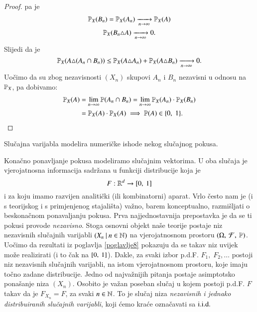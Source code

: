 \begin{proof}
    pa je
    \begin{equation*}
        \begin{gathered}
            \mathbb{P}_X (B_n) = \mathbb{P}_X (A_n) \xrightarrow[n \to \infty]{} \mathbb{P}_X (A)\\
            \mathbb{P}_X (B_n \triangle A) \xrightarrow[n \to \infty]{} 0.
        \end{gathered}
    \end{equation*}
    Slijedi da je
    \begin{equation*}
        \mathbb{P}_X (A \triangle (A_n \cap B_n)) \leq \mathbb{P}_X (A \triangle A_n) + \mathbb{P}_X (A \triangle B_n) \xrightarrow[n \to \infty]{} 0.
    \end{equation*}
    Uo\v cimo da su zbog nezavisnosti $(X_n)$ skupovi $A_n$ i $B_n$ nezavisni u odnosu na $\mathbb{P}_X$, pa dobivamo:
    \begin{equation*}
        \begin{aligned}
            \mathbb{P}_X (A)
            &= \lim\limits_{n \to \infty} \mathbb{P} (A_n \cap B_n) = \lim\limits_{n \to \infty} \mathbb{P}_X (A_n) \cdot \mathbb{P}_X (B_n)\\
            &= \mathbb{P}_X (A) \cdot \mathbb{P}_X(A) \implies \mathbb{P}(A) \in \{0, \; 1\}.
        \end{aligned}
    \end{equation*}
\end{proof}

\begin{nap} \label{nap:9.12}
    Slu\v cajna varijabla modelira numeri\v cke ishode nekog slu\v cajnog pokusa.
    
    Kona\v cno ponavljanje pokusa modeliramo slu\v cajnim vektorima.
    U oba slu\v caja je vjerojatnosna informacija sadr\v zana u funkciji distribucije koja je
    \begin{equation*}
        F: \mathbb{R}^d \to [{0}, \:{1}]
    \end{equation*}
    i za koju imamo razvijen analiti\v cki (ili kombinatorni) aparat.
    Vrlo \v cesto nam je (i s teorijskog i s primjenjenog stajali\v sta) va\v zno, barem konceptualno, razmi\v sljati o beskona\v cnom ponavaljanju pokusa.
    Prva najjednostavnija prepostavka je da se ti pokusi provode \emph{nezavisno}.
    Stoga osnovni objekt na\v se teorije postaje niz nezavisnih slu\v cajnih varijabli $({X_n} \: | \: {n \in \mathbb{N}})$ na vjerojatnosnom prostoru $(\Omega, \: \mathcal{F}, \: \mathbb{P})$.
    Uo\v cimo da rezultati iz poglavlja \ref{poglavlje8} pokazuju da se takav niz uvijek mo\v ze realizirati (i to \v cak na $[{0}, \:{1}]$).
    Dakle, za svaki izbor p.d.F. $F_1, \; F_2, \ldots$ postoji niz nezavisnih slu\v cajnih varijabli, na istom vjerojatnosnom prostoru, koje imaju to\v cno zadane distribucije.
    Jedno od najva\v znijih pitanja postaje asimptotsko pona\v sanje niza $(X_n)$.
    Osobito je va\v zan poseban slu\v caj u kojem postoji p.d.F. $F$ takav da je $F_{X_n} = F$, za svaki $n \in \mathbb{N}$.
    To je slu\v caj niza \emph{nezavisnih i jednako distribuiranih slu\v cajnih varijabli}, koji \' cemo kra\' ce ozna\v cavati sa $\mathrm{i.i.d.}$
\end{nap}